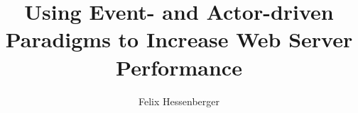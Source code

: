 \documentclass[master, english]{hgbthesis}
\begin{document}
\title{Using Event- and Actor-driven Paradigms to Increase Web Server Performance}

\author{Felix Hessenberger}

\frontmatter
\maketitle
\tableofcontents 
	
			

		

\mainmatter	












 
\appendix



\end{document}
